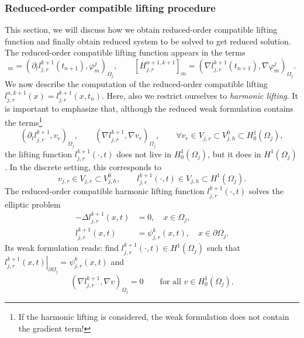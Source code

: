 \documentclass[a4paper, 11pt]{article}
\theoremstyle{remark}
\begin{document}
\subsubsection{Reduced-order compatible lifting procedure}
This section, we will discuss how we obtain reduced-order compatible lifting function and finally obtain reduced system to be solved to get reduced solution. The reduced-order compatible lifting function appears in the terms 
\begin{equation*}
    [G^{n+1, k+1}_{j, r}]_m = (\partial_t l_{j, r}^{k+1}(t_{n+1}), \varphi_{m}^{j})_{\Omega_j}, \qquad
    [H^{n+1, k+1}_{j, r}]_m = (\nabla l_{j, r}^{k+1}(t_{n+1}), \nabla \varphi_{m}^{j})_{\Omega_j}.
\end{equation*}
We now describe the computation of the reduced-order compatible lifting $l_{j, r}^{n, k+1}(x) = l_{j, r}^{k+1}(x, t_{n})$. Here, also we restrict ourselves to \textit{harmonic lifting}. It is important to emphasize that, although the reduced weak formulation contains the terms\footnote{If the harmonic lifting is considered, the weak formulation does not contain the gradient term!}
\begin{equation*}
    \left(\partial_{t} l_{j, r}^{k+1}, v_{r}\right)_{\Omega_{j}}, \qquad \left(\nabla l_{j, r}^{k+1}, \nabla v_{r}\right)_{\Omega_{j}}, \qquad \forall v_{r} \in V_{j, r} \subset V^{0}_{j, h} \subset H^{1}_{0}(\Omega_{j}),
\end{equation*}
the lifting function $l_{j, r}^{k+1}(\cdot, t)$ does not live in $H^{1}_{0}(\Omega_{j})$, but it does in $H^{1}(\Omega_{j})$. In the discrete setting, this corresponds to
\begin{equation*}
    v_{j, r}\in V_{j, r}\subset V^{0}_{j, h}, \qquad l_{j, r}^{k+1}(\cdot, t)\in V_{j, h}\subset H^{1}(\Omega_{j}).
\end{equation*}
The reduced-order compatible harmonic lifting function $l_{j, r}^{k+1}(\cdot, t)$ solves the elliptic problem
\begin{align*}
    -\Delta l_{j, r}^{k+1}(x, t) &= 0, \quad x\in\Omega_j,\\
    l_{j, r}^{k+1}(x, t) &= \psi_{j, r}^{k}(x, t), \quad x\in \partial\Omega_j.
\end{align*}
Its weak formulation reads: find $l_{j, r}^{k+1}(\cdot, t)\in H^{1}(\Omega_{j})$ such that $\left.l_{j, r}^{k+1}(x, t)\right|_{\partial\Omega_{j}} = \psi_{j, r}^{k}(x, t)$ and
\begin{equation*}
    \left(\nabla l_{j, r}^{k+1}, \nabla v\right)_{\Omega_{j}} = 0 \qquad \text{for all } v\in H^{1}_{0}(\Omega_{j}).
\end{equation*}
\end{document}
